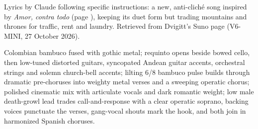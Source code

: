 
\label{sec:amor-sin-gloria}
\begin{notes}
Lyrics by Claude following specific instructions: a new, anti-cliché song inspired by \emph{Amor, contra todo} (page \pageref{sec:amor-contra-todo}), keeping its duet form but trading mountains and thrones for traffic, rent and laundry. Retrieved from Dvigitt's Suno page (V6-MINI, 27 October 2026).
\end{notes}
\begin{style}
Colombian bambuco fused with gothic metal; requinto opens beside bowed cello, then low-tuned distorted guitars, syncopated Andean guitar accents, orchestral strings and solemn church-bell accents; lilting 6/8 bambuco pulse builds through dramatic pre-choruses into weighty metal verses and a sweeping operatic chorus; polished cinematic mix with articulate vocals and dark romantic weight; low male death-growl lead trades call-and-response with a clear operatic soprano, backing voices punctuate the verses, gang-vocal shouts mark the hook, and both join in harmonized Spanish choruses.
\end{style}
